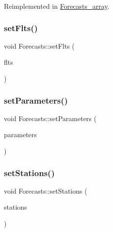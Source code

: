 Reimplemented in \mbox{\hyperlink{class_forecasts__array_a56985347f516340034b29dc4cdda87b1}{Forecasts\+\_\+array}}.

\mbox{\label{class_forecasts_aa15a4e56c5747afc1594131ad30e4fc3}} 
\subsubsection{\texorpdfstring{set\+Flts()}{setFlts()}}
{\footnotesize\ttfamily void Forecasts\+::set\+Flts (\begin{DoxyParamCaption}\item[{\mbox{\hyperlink{classanen_time_1_1_f_l_ts}{anen\+Time\+::\+F\+L\+Ts}}}]{flts }\end{DoxyParamCaption})}

\mbox{\label{class_forecasts_a8dd1f257833a71c72deb3e8d595d607e}} 
\subsubsection{\texorpdfstring{set\+Parameters()}{setParameters()}}
{\footnotesize\ttfamily void Forecasts\+::set\+Parameters (\begin{DoxyParamCaption}\item[{\mbox{\hyperlink{classanen_par_1_1_parameters}{anen\+Par\+::\+Parameters}}}]{parameters }\end{DoxyParamCaption})}

\mbox{\label{class_forecasts_aeb1ca08f01a0ff5145607f8e962fb750}} 
\subsubsection{\texorpdfstring{set\+Stations()}{setStations()}}
{\footnotesize\ttfamily void Forecasts\+::set\+Stations (\begin{DoxyParamCaption}\item[{\mbox{\hyperlink{classanen_sta_1_1_stations}{anen\+Sta\+::\+Stations}}}]{stations }\end{DoxyParamCaption})}

